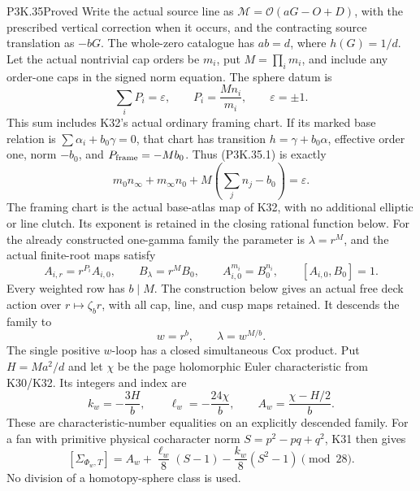 \begin{statement}{P3K.35}{Proved}
Write the actual source line as
\(\mathcal M=\mathcal O(aG-O+D)\), with the prescribed vertical
correction when it occurs, and the contracting source translation as
\(-bG\). The whole-zero catalogue has \(ab=d\), where \(h(G)=1/d\).
Let the actual nontrivial cap orders be \(m_i\), put
\(M=\prod_i m_i\), and include any order-one caps in the signed
norm equation. The sphere datum is
\[
           \sum_i P_i=\varepsilon,\qquad
           P_i=\frac{M n_i}{m_i},\qquad \varepsilon=\pm1.
                                                               \tag{P3K.35.1}
\]
This sum includes K32's actual ordinary framing chart. If its marked
base relation is \(\sum\alpha_i+b_0\gamma=0\), that chart has
transition \(h=\gamma+b_0\alpha\), effective order one, norm
\(-b_0\), and \(P_{\rm frame}=-Mb_0\). Thus (P3K.35.1) is exactly
\[
 m_0n_\infty+m_\infty n_0
                +M\left(\sum_jn_j-b_0\right)=\varepsilon.
\]
The framing chart is the actual base-atlas map of K32, with no
additional elliptic or line clutch. Its exponent is retained in
the closing rational function below.
For the already constructed one-gamma family the parameter is
\(\lambda=r^M\), and the actual finite-root maps satisfy
\[
 A_{i,r}=r^{P_i}A_{i,0},\qquad B_\lambda=r^M B_0,
 \qquad A_{i,0}^{m_i}=B_0^{n_i},\qquad[A_{i,0},B_0]=1.
                                                               \tag{P3K.35.2}
\]
Every weighted row has \(b\mid M\). The construction below gives
an actual free deck action over \(r\mapsto\zeta_b r\), with all
cap, line, and cusp maps retained. It descends the family to
\[
                     w=r^b,\qquad \lambda=w^{M/b}.       \tag{P3K.35.3}
\]
The single positive \(w\)-loop has a closed simultaneous Cox product.
Put \(H=Ma^2/d\) and let \(\chi\) be the page holomorphic Euler
characteristic from K30/K32. Its integers and index are
\[
 k_w=-\frac{3H}{b},\qquad
 \ell_w=-\frac{24\chi}{b},\qquad
 A_w=\frac{\chi-H/2}{b}.                              \tag{P3K.35.4}
\]
These are characteristic-number equalities on an explicitly descended
family. For a fan with primitive physical cocharacter norm
\(S=p^2-pq+q^2\), K31 then gives
\[
 [\Sigma_{\Phi_w,T}]
      =A_w+\frac{\ell_w}{8}(S-1)
                   -\frac{k_w}{8}(S^2-1)\pmod {28}.     \tag{P3K.35.5}
\]
No division of a homotopy-sphere class is used.
\end{statement}
